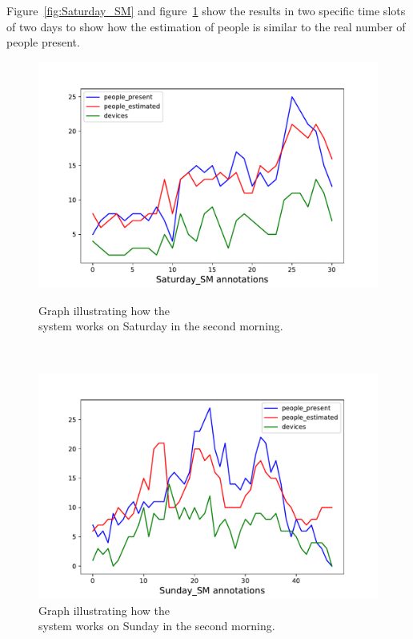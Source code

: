 Figure~\ref{fig:Saturday_SM} and figure~\ref{fig:Sunday_SM} show the results in two specific time slots of two days to show how the estimation of people is similar to the real number of people present.

\begin{figure}[H]
\begin{minipage}[b]{8.5cm}
\centering
\includegraphics[width=1\textwidth]{images/Saturday_SM}
\caption{Graph illustrating how the\\system works on Saturday in the second morning.}
\label{fig:Saturday_SM}
\end{minipage}
\ \hspace{2mm} \
\begin{minipage}[b]{8.5cm}
\centering
\includegraphics[width=1\textwidth]{images/Sunday_SM}
\caption{Graph illustrating how the\\system works on Sunday in the second morning.}
\label{fig:Sunday_SM}
\end{minipage}
\end{figure}

